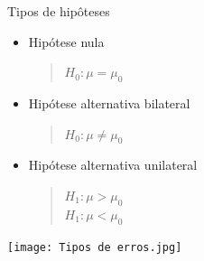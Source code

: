 \documentclass{article}
\begin{document}
  Tipos de hipôteses
  
  \begin{center}\begin{itemize}
    \item Hipótese nula
    \begin{quote}
      $ H_0: \mu = \mu_0 $
    \end{quote}
    \item Hipótese alternativa bilateral
    \begin{quote}
      $ H_0: \mu \neq \mu_0 $
    \end{quote}
    \item Hipótese alternativa unilateral
    \begin{quote}
      $ H_1: \mu > \mu_0 $\\
      $ H_1: \mu < \mu_0 $
    \end{quote}
  \end{itemize}

  \hbox{\texttt{[image: Tipos de erros.jpg]}}
  \end{center}

  
\end{document}
